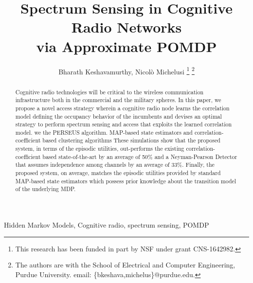 \documentclass[10pt,twocolumn]{IEEEtran}
\title{Spectrum Sensing in Cognitive Radio Networks
\\
via Approximate POMDP\sst{ methods}}
\author{Bharath Keshavamurthy, Nicol\`{o} Michelusi
\thanks{This research has been funded in part by NSF under grant CNS-1642982.}
\thanks{The authors are with the School of Electrical and Computer Engineering, Purdue University. email: \{bkeshava,michelus\}@purdue.edu.}
\vspace{-5mm}}
\newcommand{\sst}[1]{}
\newcommand{\nm}[1]{}
\newcommand{\add}[1]{{\color{red}{#1}}}
\begin{document}
 
\maketitle
{}
\nm{abstract is way too long.. limit to 200 words}
\begin{abstract}
Cognitive radio technologies will be critical to the wireless communication infrastructure
\add{due to their potential to alleviate the spectrum crunch,}\sst{ in the near future due to the increasingly incredible number of applications being added to the computer networking ecosystem,} both in the commercial and the military spheres\sst{, resulting in increased pressure on the available spectrum, which is a limited physical resource}. In this paper, we propose a novel \add{spectrum sensing and}\sst{ channel} access strategy\sst{ in networks with multiple licensed users} \add{based on partially observable Markov decision processes (POMDPs)} wherein a cognitive radio node learns the correlation model defining the occupancy behavior of the incumbents and devises an optimal strategy to perform spectrum sensing and access that exploits the learned correlation model.
\add{To alleviate the complexity of the POMDP optimization,}\sst{ Since the computational complexity associated with solving for the optimal spectrum sensing and channel access strategy scales exponentially}\nm{it is actually doubly-exponential for POMDPs..}\sst{ with the number of spectrum bands under consideration,} we \add{employ}\sst{ propose a system employing approximate POMDP value iteration methods, namely,} the PERSEUS algorithm\add{, an approximate value iteration method}.\sst{ Furthermore, through system simulations,} \add{We compare numerically the performance of the proposed algorithms with state-of-the-art}\sst{we compare the performance of standard} MAP-based state estimators and correlation-coefficient based clustering algorithms\sst{ in the state-of-the-art against our proposed system employing a customized PERSEUS algorithm, with respect to the secondary network throughput and the number of collisions with the incumbent transmissions.} \add{and demonstrate that....}\nm{fix} These simulations show that the proposed system, in terms of the episodic utilities\nm{what do you mean by episodic utility?}, out-performs the existing correlation-coefficient based state-of-the-art by an average of 50\% and a Neyman-Pearson Detector that assumes independence among channels by an average of 33\%. Finally, the proposed system, on average, matches the episodic utilities provided by standard MAP-based state estimators which possess prior knowledge about the transition model of the underlying MDP.
\end{abstract}
\begin{IEEEkeywords}
Hidden Markov Models, Cognitive radio, spectrum sensing, POMDP
\end{IEEEkeywords}
\end{document}
